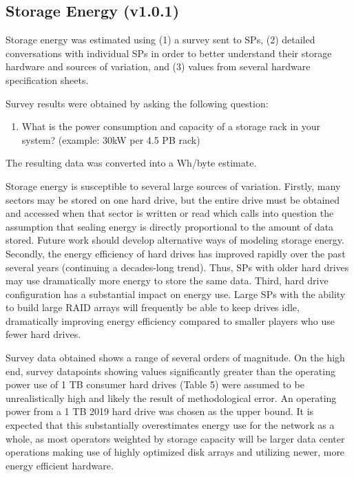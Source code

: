 \documentclass[9pt, oneside]{article}   	%
\begin{document}
\begin{multicols}{2}
\section{Storage Energy (v1.0.1)}

Storage energy was estimated using (1) a survey sent to SPs, (2) detailed conversations with individual SPs in order to better understand their storage hardware and sources of variation, and (3) values from several hardware specification sheets.

Survey results were obtained by asking the following question:

\begin{enumerate}
\item What is the power consumption and capacity of a storage rack in your system? (example: 30kW per 4.5 PB rack)
\end{enumerate}

The resulting data was converted into a Wh/byte estimate.

Storage energy is susceptible to several large sources of variation. Firstly, many sectors may be stored on one hard drive, but the entire drive must be obtained and accessed when that sector is written or read which calls into question the assumption that sealing energy is directly proportional to the amount of data stored. Future work should develop alternative ways of modeling storage energy. Secondly, the energy efficiency of hard drives has improved rapidly over the past several years (continuing a decades-long trend). Thus, SPs with older hard drives may use dramatically more energy to store the same data. Third, hard drive configuration has a substantial impact on energy use. Large SPs with the ability to build large RAID arrays will frequently be able to keep drives idle, dramatically improving energy efficiency compared to smaller players who use fewer hard drives.

Survey data obtained shows a range of several orders of magnitude. On the high end, survey datapoints showing values significantly greater than the operating power use of 1 TB consumer hard drives (Table 5) were assumed to be unrealistically high and likely the result of methodological error. An operating power from a 1 TB 2019 hard drive was chosen as the upper bound. It is expected that this substantially overestimates energy use for the network as a whole, as most operators weighted by storage capacity will be larger data center operations making use of highly optimized disk arrays and utilizing newer, more energy efficient hardware.


\end{multicols}
\end{document}

